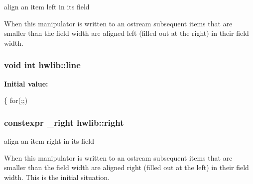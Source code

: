 align an item left in its field 

When this manipulator is written to an ostream subsequent items that are smaller than the field width are aligned left (filled out at the right) in their field width. 
\subsubsection[{\texorpdfstring{line}{line}}]{\setlength{\rightskip}{0pt plus 5cm}void int {\bf hwlib\+::line}}\hypertarget{namespacehwlib_a953e0b4eaa20be854dff2571bee5fa4f}{}\label{namespacehwlib_a953e0b4eaa20be854dff2571bee5fa4f}
{\bfseries Initial value\+:}
\begin{DoxyCode}
\{
   \textcolor{keywordflow}{for}(;;)
\end{DoxyCode}
\subsubsection[{\texorpdfstring{right}{right}}]{\setlength{\rightskip}{0pt plus 5cm}constexpr {\bf \+\_\+right} hwlib\+::right}\hypertarget{namespacehwlib_a26a6aead1d4dc1a990ab77bf2b730740}{}\label{namespacehwlib_a26a6aead1d4dc1a990ab77bf2b730740}


align an item right in its field 

When this manipulator is written to an ostream subsequent items that are smaller than the field width are aligned right (filled out at the left) in their field width. This is the initial situation. 